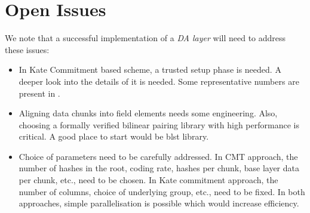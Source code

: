 \documentclass[sigconf, screen=true, nonacm]{acmart}
\newcommand{\DA}{\textit{DA layer}}
\begin{document}
\section{Open Issues}
    We note that a successful implementation of a \DA{} will need to address these issues:
    \begin{itemize}
        \item In Kate Commitment based scheme, a trusted setup phase is needed. A deeper look into the details of it is needed. Some representative numbers are present in \cite{dankrad_poly:2019}.
        \item Aligning data chunks into field elements needs some engineering. Also, choosing a formally verified bilinear pairing library with high performance is critical. A good place to start would be blst library. 
        \item Choice of parameters need to be carefully addressed. In CMT approach, the number of hashes in the root, coding rate, hashes per chunk, base layer data per chunk, etc., need to be chosen. In Kate commitment approach, the number of columns, choice of underlying group, etc., need to be fixed. In both approaches, simple parallelisation is possible which would increase efficiency. 
    \end{itemize}



\end{document}
